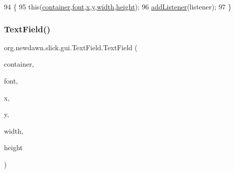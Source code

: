 \begin{DoxyCode}
94                                                              \{
95         \textcolor{keyword}{this}(\mbox{\hyperlink{classorg_1_1newdawn_1_1slick_1_1gui_1_1_abstract_component_af6d1abaa24da0b9a06fb153722e15435}{container}},\mbox{\hyperlink{classorg_1_1newdawn_1_1slick_1_1gui_1_1_text_field_af54f063de3967c819706c514a27fdf12}{font}},\mbox{\hyperlink{classorg_1_1newdawn_1_1slick_1_1gui_1_1_text_field_a05dd91af6b1552f194c1aadbdf894c8c}{x}},\mbox{\hyperlink{classorg_1_1newdawn_1_1slick_1_1gui_1_1_text_field_acb0df9f048eabd20f6d5d40799b48706}{y}},\mbox{\hyperlink{classorg_1_1newdawn_1_1slick_1_1gui_1_1_text_field_aa0b76a23e9820ca0c01294f8de515b8e}{width}},\mbox{\hyperlink{classorg_1_1newdawn_1_1slick_1_1gui_1_1_text_field_ad3a2b3a6afaee86e3c3a186b79a49564}{height}});
96         \mbox{\hyperlink{classorg_1_1newdawn_1_1slick_1_1gui_1_1_abstract_component_aa3bc3dddf346a26d8e26555106f2bae6}{addListener}}(listener);
97     \}
\end{DoxyCode}
\mbox{\label{classorg_1_1newdawn_1_1slick_1_1gui_1_1_text_field_a67c76b153d1674066665f5d5e9706e36}} 
\subsubsection{\texorpdfstring{Text\+Field()}{TextField()}\hspace{0.1cm}{\footnotesize\ttfamily [2/2]}}
{\footnotesize\ttfamily org.\+newdawn.\+slick.\+gui.\+Text\+Field.\+Text\+Field (\begin{DoxyParamCaption}\item[{\mbox{\hyperlink{interfaceorg_1_1newdawn_1_1slick_1_1gui_1_1_g_u_i_context}{G\+U\+I\+Context}}}]{container,  }\item[{\mbox{\hyperlink{interfaceorg_1_1newdawn_1_1slick_1_1_font}{Font}}}]{font,  }\item[{int}]{x,  }\item[{int}]{y,  }\item[{int}]{width,  }\item[{int}]{height }\end{DoxyParamCaption})\hspace{0.3cm}{\ttfamily [inline]}}


